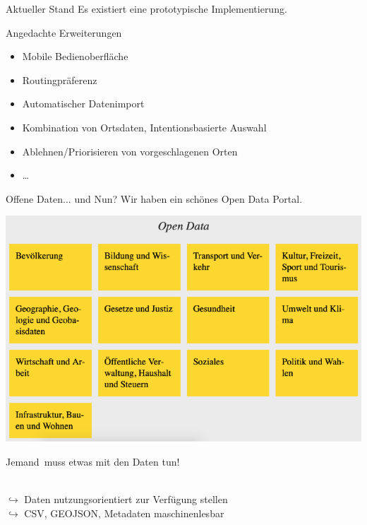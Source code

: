 \documentclass[13pt, usenames, dvipsnames]{beamer}
\begin{document}
\begin{frame}{Aktueller Stand}
	Es existiert eine \alert{prototypische Implementierung}.\\
	\pause
	\vspace{1.0cm}
	\begin{alertblock}{Angedachte Erweiterungen}
		\begin{itemize}
			\item Mobile Bedienoberfläche
			\item Routingpräferenz
			\item Automatischer Datenimport
			\item Kombination von Ortsdaten, Intentionsbasierte Auswahl
			\item Ablehnen/Priorisieren von vorgeschlagenen Orten
			\item \dots
		\end{itemize}
	\end{alertblock}
\end{frame}

\begin{frame}{Offene Daten... und Nun?}
    \centering
    Wir haben ein schönes Open Data Portal.
    \begin{center}
        \includegraphics[trim=0 200 0 0,clip,width=.8\textwidth]{openData.png}
    \end{center}
    \glqq Jemand\grqq~muss etwas mit den Daten tun!\\
    \pause
    {\footnotesize
    }\\
    \pause
    $\hookrightarrow$ Daten nutzungsorientiert zur Verfügung stellen\\
    $\hookrightarrow$ CSV, GEOJSON, Metadaten maschinenlesbar\\
\end{frame}
\end{document}
